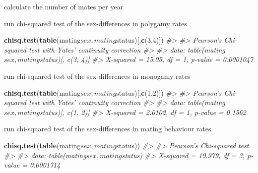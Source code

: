 \documentclass[]{article}
\newenvironment{Shaded}{\begin{snugshade}}{\end{snugshade}}
\newcommand{\KeywordTok}[1]{\textcolor[rgb]{0.13,0.29,0.53}{\textbf{{#1}}}}
\newcommand{\DecValTok}[1]{\textcolor[rgb]{0.00,0.00,0.81}{{#1}}}
\newcommand{\StringTok}[1]{\textcolor[rgb]{0.31,0.60,0.02}{{#1}}}
\newcommand{\CommentTok}[1]{\textcolor[rgb]{0.56,0.35,0.01}{\textit{{#1}}}}
\newcommand{\NormalTok}[1]{{#1}}
\begin{document}
calculate the number of mates per year

\begin{Shaded}
\end{Shaded}

run chi-squared test of the sex-differences in polygamy rates

\begin{Shaded}
\begin{Highlighting}[]
\KeywordTok{chisq.test}\NormalTok{(}\KeywordTok{table}\NormalTok{(mating$sex, mating$status)[,}\KeywordTok{c}\NormalTok{(}\DecValTok{3}\NormalTok{,}\DecValTok{4}\NormalTok{)])}
\CommentTok{#> }
\CommentTok{#>  Pearson's Chi-squared test with Yates' continuity correction}
\CommentTok{#> }
\CommentTok{#> data:  table(mating$sex, mating$status)[, c(3, 4)]}
\CommentTok{#> X-squared = 15.05, df = 1, p-value = 0.0001047}
\end{Highlighting}
\end{Shaded}

run chi-squared test of the sex-differences in monogamy rates

\begin{Shaded}
\begin{Highlighting}[]
\KeywordTok{chisq.test}\NormalTok{(}\KeywordTok{table}\NormalTok{(mating$sex, mating$status)[,}\KeywordTok{c}\NormalTok{(}\DecValTok{1}\NormalTok{,}\DecValTok{2}\NormalTok{)])}
\CommentTok{#> }
\CommentTok{#>  Pearson's Chi-squared test with Yates' continuity correction}
\CommentTok{#> }
\CommentTok{#> data:  table(mating$sex, mating$status)[, c(1, 2)]}
\CommentTok{#> X-squared = 2.0102, df = 1, p-value = 0.1562}
\end{Highlighting}
\end{Shaded}

run chi-squared test of the sex-differences in mating behaviour rates

\begin{Shaded}
\begin{Highlighting}[]
\KeywordTok{chisq.test}\NormalTok{(}\KeywordTok{table}\NormalTok{(mating$sex, mating$status))}
\CommentTok{#> }
\CommentTok{#>  Pearson's Chi-squared test}
\CommentTok{#> }
\CommentTok{#> data:  table(mating$sex, mating$status)}
\CommentTok{#> X-squared = 19.979, df = 3, p-value = 0.0001714}
\end{Highlighting}
\end{Shaded}
\end{document}
